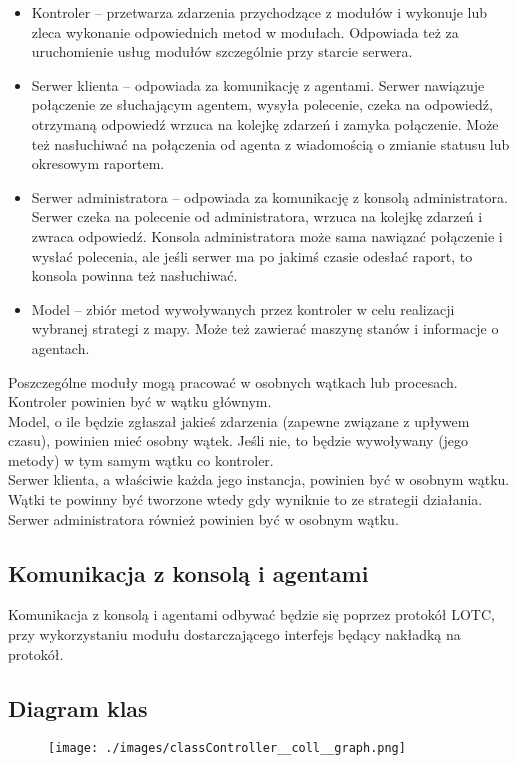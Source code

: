 \documentclass[10pt,a4paper]{article}
\begin{document}
			\begin{itemize}   
				\item Kontroler – przetwarza zdarzenia przychodzące z modułów i wykonuje lub zleca wykonanie odpowiednich metod w modułach. Odpowiada też za uruchomienie usług modułów szczególnie przy starcie serwera.
				\item Serwer klienta – odpowiada za komunikację z agentami. Serwer nawiązuje połączenie ze słuchającym agentem, wysyła polecenie, czeka na odpowiedź, otrzymaną odpowiedź wrzuca na kolejkę zdarzeń i zamyka połączenie. Może też nasłuchiwać na połączenia od agenta z wiadomością o zmianie statusu lub okresowym raportem.
				\item Serwer administratora – odpowiada za komunikację z konsolą administratora. Serwer czeka na polecenie od administratora, wrzuca na kolejkę zdarzeń i zwraca odpowiedź. Konsola administratora może sama nawiązać połączenie i wysłać polecenia, ale jeśli serwer ma po jakimś czasie odesłać raport, to konsola powinna też nasłuchiwać.
				\item Model – zbiór metod wywoływanych przez kontroler w celu realizacji wybranej strategi z mapy. Może też zawierać maszynę stanów i informacje o agentach.
			\end{itemize}
			Poszczególne moduły mogą pracować w osobnych wątkach lub procesach. Kontroler powinien być w wątku głównym. \\
			Model, o ile będzie zgłaszał jakieś zdarzenia (zapewne związane z upływem czasu), powinien mieć osobny wątek. Jeśli nie, to będzie wywoływany (jego metody) w tym samym wątku co kontroler. \\
			Serwer klienta, a właściwie każda jego instancja, powinien być w osobnym wątku. Wątki te powinny być tworzone wtedy gdy wyniknie to ze strategii działania. \\
			Serwer administratora również powinien być w osobnym wątku. \\
		
		\subsection{Komunikacja z konsolą i agentami}
			Komunikacja z konsolą i agentami odbywać będzie się poprzez protokół LOTC, przy wykorzystaniu modułu dostarczającego interfejs będący nakładką na protokół. \\
	    
	    \subsection{Diagram klas}
		    \begin{figure}[H]
				\texttt{[image: ./images/classController\_\_coll\_\_graph.png]}
		    \end{figure}		
    
\end{document}
